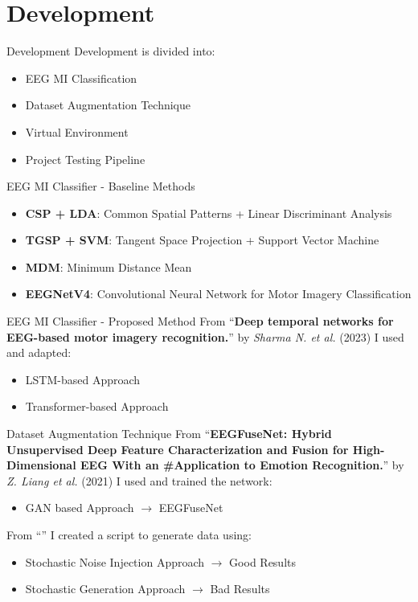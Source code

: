 \section{Development}
\begin{frame}{Development}
Development is divided into:
\begin{itemize}
    \item EEG MI Classification
    \item Dataset Augmentation Technique
    \item Virtual Environment
    \item Project Testing Pipeline
\end{itemize}
\end{frame}

\begin{frame}{EEG MI Classifier - Baseline Methods}
\begin{itemize}
    \item \textbf{CSP + LDA}: Common Spatial Patterns + Linear Discriminant Analysis
    \item \textbf{TGSP + SVM}: Tangent Space Projection + Support Vector Machine
    \item \textbf{MDM}: Minimum Distance Mean
    \item \textbf{EEGNetV4}: Convolutional Neural Network for Motor Imagery Classification
\end{itemize}
\end{frame}

\begin{frame}{EEG MI Classifier - Proposed Method}
    From ``\textbf{Deep temporal networks for EEG-based motor imagery recognition.}'' by \textit{Sharma N. et al.} (2023) I used and adapted: 
    \begin{itemize}
        \item LSTM-based Approach
        \item Transformer-based Approach
    \end{itemize}
\end{frame}

\begin{frame}{Dataset Augmentation Technique}
    From ``\textbf{EEGFuseNet: Hybrid Unsupervised Deep Feature Characterization and Fusion for High-Dimensional EEG With an \#Application to Emotion Recognition.}'' by \textit{Z. Liang et al.} (2021) I used and trained the network:
    \begin{itemize}
        \item GAN based Approach $\rightarrow{}$ EEGFuseNet
    \end{itemize}
    From ``'' I created a script to generate data using:
    \begin{itemize}
        \item Stochastic Noise Injection Approach $\rightarrow{}$ Good Results
        \item Stochastic Generation Approach $\rightarrow{}$ Bad Results
    \end{itemize}
\end{frame}

